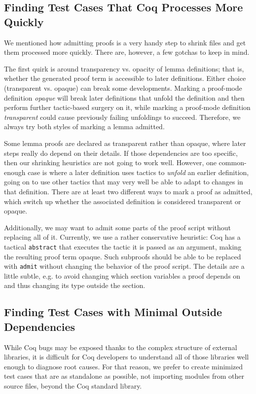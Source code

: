 \documentclass[a4paper,USenglish,cleveref,autoref,thm-restate]{lipics-v2021}
\begin{document}
\subsection{Finding Test Cases That Coq Processes More Quickly}

We mentioned how admitting proofs is a very handy step to shrink files and get them processed more quickly.
There are, however, a few gotchas to keep in mind.

The first quirk is around transparency vs. opacity of lemma definitions; that is, whether the generated proof term is accessible to later definitions.
Either choice (transparent vs. opaque) can break some developments.
Marking a proof-mode definition \emph{opaque} will break later definitions that unfold the definition and then perform further tactic-based surgery on it, while marking a proof-mode definition \emph{transparent} could cause previously failing unfoldings to succeed.
Therefore, we always try both styles of marking a lemma admitted.

Some lemma proofs are declared as transparent rather than opaque, where later steps really do depend on their details.
If those dependencies are too specific, then our shrinking heuristics are not going to work well.
However, one common-enough case is where a later definition uses tactics to \emph{unfold} an earlier definition, going on to use other tactics that may very well be able to adapt to changes in that definition.
There are at least two different ways to mark a proof as admitted, which switch up whether the associated definition is considered transparent or opaque.

Additionally, we may want to admit some parts of the proof script without replacing all of it.
Currently, we use a rather conservative heuristic:
Coq has a tactical \verb|abstract| that executes the tactic it is passed as an argument, making the resulting proof term opaque.
Such subproofs should be able to be replaced with \verb|admit| without changing the behavior of the proof script.
The details are a little subtle, e.g. to avoid changing which section variables a proof depends on and thus changing its type outside the section.

\label{text:ltac-fragment:orig}

\subsection{Finding Test Cases with Minimal Outside Dependencies}

While Coq bugs may be exposed thanks to the complex structure of external libraries, it is difficult for Coq developers to understand all of those libraries well enough to diagnose root causes.
For that reason, we prefer to create minimized test cases that are as standalone as possible, not importing modules from other source files, beyond the Coq standard library.
\end{document}
